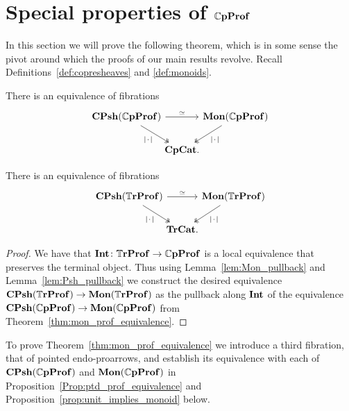 \documentclass[11pt,oneside,article]{memoir}
\begin{document}
\section{Special properties of $\mathbb{C}\mathbf{pProf}$}
  \label{sec:special_CompProf}

In this section we will prove the following theorem, which is in some sense the pivot around which
the proofs of our main results revolve. Recall Definitions~\ref{def:copresheaves} and
\ref{def:monoids}.

\begin{theorem}
    \label{thm:mon_prof_equivalence}
  There is an equivalence of fibrations
  \[ \begin{tikzcd}[column sep=-.5em]
    \CPsh(\dCompProf) \ar[rr,"\equiv"] \ar[dr,two heads,"\MOb"']
      && \Mon(\dCompProf) \ar[dl,two heads,"\MOb"] \\
    & \CompCat. &
  \end{tikzcd} \]
\end{theorem}

\begin{corollary}
    \label{cor:Tr_mon_prof_equivalence}
  There is an equivalence of fibrations
  \[ \begin{tikzcd}[column sep=-.5em]
    \CPsh(\dTrProf) \ar[rr,"\equiv"] \ar[dr,two heads,"\MOb"']
      && \Mon(\dTrProf) \ar[dl,two heads,"\MOb"] \\
    & \TrCat. &
  \end{tikzcd} \]
\end{corollary}
\begin{proof}
  We have that $\mathbf{Int}\colon\mathbb{T}\mathbf{rProf}\to\mathbb{C}\mathbf{pProf}$ is a local equivalence that preserves the terminal
  object. Thus using Lemma~\ref{lem:Mon_pullback} and Lemma~\ref{lem:Psh_pullback} we construct the
  desired equivalence $\mathbf{CPsh}(\mathbb{T}\mathbf{rProf})\to\mathbf{Mon}(\mathbb{T}\mathbf{rProf})$ as the pullback along $\mathbf{Int}$ of the
  equivalence $\mathbf{CPsh}(\mathbb{C}\mathbf{pProf})\to\mathbf{Mon}(\mathbb{C}\mathbf{pProf})$ from Theorem~\ref{thm:mon_prof_equivalence}.
\end{proof}

To prove Theorem~\ref{thm:mon_prof_equivalence} we introduce a third fibration, that of pointed
endo-proarrows, and establish its equivalence with each of $\mathbf{CPsh}(\mathbb{C}\mathbf{pProf})$ and
$\mathbf{Mon}(\mathbb{C}\mathbf{pProf})$ in Proposition~\ref{Prop:ptd_prof_equivalence} and
Proposition~\ref{prop:unit_implies_monoid} below.
\end{document}
